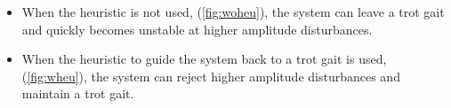 \begin{itemize}
\item When the heuristic is not used, (\ref{fig:woheu}), the system can leave a trot gait and quickly becomes unstable at higher amplitude disturbances.

\item When the heuristic to guide the system back to a trot gait is used, (\ref{fig:wheu}), the system can reject higher amplitude disturbances and maintain a trot gait. 
\end{itemize}
\vspace{-0.5in}
